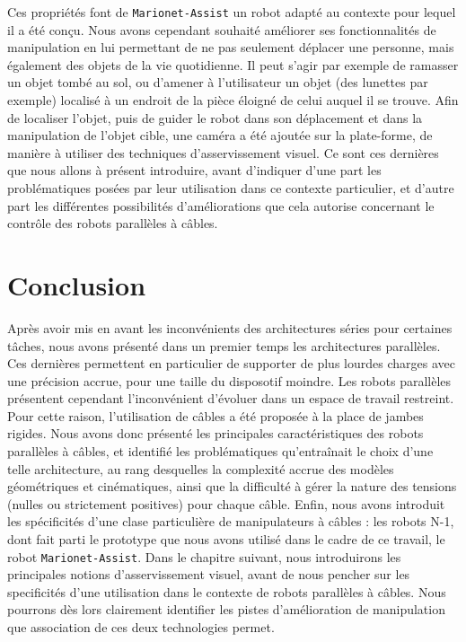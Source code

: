 Ces propriétés font de {\tt Marionet-Assist} un robot adapté au contexte pour 
lequel il a été conçu. Nous avons cependant souhaité améliorer ses 
fonctionnalités de manipulation en lui permettant de ne pas seulement déplacer 
une personne, mais également des objets de la vie quotidienne. Il peut s'agir 
par exemple de ramasser un objet tombé au sol, ou d'amener à l'utilisateur un 
objet (des lunettes par exemple) localisé à un endroit de la pièce éloigné de 
celui auquel il se trouve. Afin de localiser l'objet, puis de guider le robot 
dans son déplacement et dans la manipulation de l'objet cible, une caméra a été 
ajoutée sur la plate-forme, de manière à utiliser des techniques 
d'asservissement visuel. Ce sont ces dernières que nous allons à présent 
introduire, avant d'indiquer d'une part les problématiques posées par leur 
utilisation dans ce contexte particulier, et d'autre part les différentes 
possibilités d'améliorations que cela autorise concernant le contrôle des 
robots parallèles à câbles.

\section{Conclusion}

Apr\`es avoir mis en avant les inconv\'enients des architectures s\'eries pour 
certaines t\^aches, nous avons pr\'esent\'e dans un premier temps les 
architectures parall\`eles. Ces derni\`eres permettent en particulier de 
supporter de plus lourdes charges avec une pr\'ecision accrue, pour une taille 
du disposotif moindre. Les robots parall\`eles pr\'esentent cependant 
l'inconv\'enient d'\'evoluer dans un espace de travail restreint. Pour cette 
raison, l'utilisation de c\^ables a \'et\'e propos\'ee \`a la place de jambes 
rigides. Nous avons donc pr\'esent\'e les principales caract\'eristiques des 
robots parall\`eles \`a c\^ables, et identifi\'e les probl\'ematiques 
qu'entra\^inait le choix d'une telle architecture, au rang desquelles la 
complexit\'e accrue des mod\`eles g\'eom\'etriques et cin\'ematiques, ainsi que 
la difficult\'e \`a g\'erer la nature des tensions (nulles ou strictement 
positives) pour chaque c\^able. Enfin, nous avons introduit les 
sp\'ecificit\'es d'une clase particuli\`ere de manipulateurs \`a c\^ables : les 
robots N-1, dont fait parti le prototype que nous avons utilis\'e dans 
le cadre de ce travail, le robot {\tt Marionet-Assist}. Dans le chapitre 
suivant, nous introduirons les principales notions d'asservissement 
visuel, avant de nous pencher sur les specificit\'es d'une utilisation dans le 
contexte de robots parall\`eles \`a c\^ables. Nous pourrons d\`es lors 
clairement identifier les pistes d'am\'elioration de manipulation que 
association de ces deux technologies permet.

\vfill